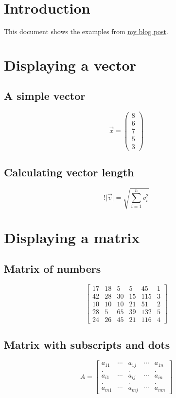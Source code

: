 \documentclass[a4paper, 12pt]{article}
\begin{document}
\section{Introduction}

This document shows the examples from \href{http://davetang.org/muse/2013/02/27/using-latex-with-wordpress/}{my blog post}.

\section{Displaying a vector}

\subsection{A simple vector}

\[
\vec{x} = \begin{pmatrix}8\\6\\7\\5\\3\end{pmatrix}
\]

\subsection{Calculating vector length}

\[
!{\lvert}\vec{v}{\rvert} = \sqrt{ \sum_{i=1}^{n}{v_i^2} }
\]

\section{Displaying a matrix}

\subsection{Matrix of numbers}

\[
\begin{bmatrix}
17 & 18 & 5 & 5 & 45 & 1 \\
42 & 28 & 30 & 15 & 115 & 3 \\
10 & 10 & 10 & 21 & 51 & 2 \\
28 & 5 & 65 & 39 & 132 & 5 \\
24 & 26 & 45 & 21 & 116 & 4
\end{bmatrix}
\]

\subsection{Matrix with subscripts and dots}

\[
A = \begin{bmatrix} a_{11} & \cdots & a_{1j} & \cdots & a_{1n} \\
. && . && . \\
a_{i1} & \cdots & a_{ij} & \cdots & a_{in} \\
. && . && . \\
a_{m1} & \cdots & a_{mj} & \cdots & a_{mn} \end{bmatrix}
\]
\end{document}
